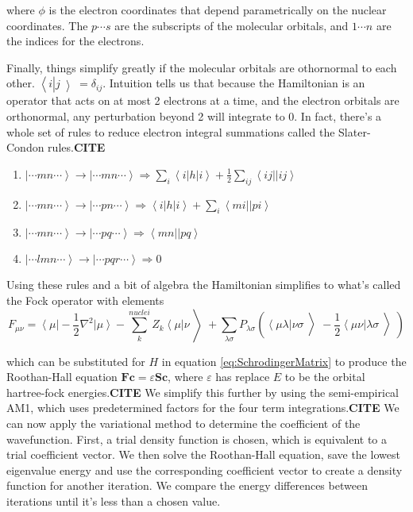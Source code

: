     where $\phi$ is the electron coordinates that depend parametrically on the
    nuclear coordinates.  The $p \cdots s$ are the subscripts of the
    molecular orbitals, and $1 \cdots n$ are the indices for the
    electrons.

    Finally, things simplify greatly if the molecular orbitals are
    othornormal to each other. $\left<\right.i\left|\right.j\left>\right. = \delta_{ij}$.
    Intuition tells us that because the Hamiltonian is an operator that
    acts on at most 2 electrons at a time, and the electron orbitals
    are orthonormal, any perturbation beyond 2 will integrate to 0.  In
    fact, there's a whole set of rules to reduce electron integral
    summations called the Slater-Condon rules.\textbf{CITE}

    \begin{enumerate}
    \item
      $ \left | \cdots mn \cdots \right > \rightarrow \left | \cdots mn
	\cdots \right > \Rightarrow \sum_i \left< i \right| h \left| i
      \right> + \frac{1}{2} \sum_{ij} \left< ij \right|\left| ij \right> $
    \item
      $ \left | \cdots mn \cdots \right > \rightarrow \left | \cdots pn
	\cdots \right > \Rightarrow \left< i \right| h \left| i \right> +
      \sum_{i} \left<mi \right|\left| pi \right> $
    \item
      $ \left | \cdots mn \cdots \right > \rightarrow \left | \cdots pq
	\cdots \right > \Rightarrow \left < mn \right | \left | pq \right
      > $
    \item
      $ \left | \cdots lmn \cdots \right > \rightarrow \left | \cdots pqr
	\cdots \right > \Rightarrow 0 $
    \end{enumerate}

    Using these rules and a bit of algebra the Hamiltonian simplifies to
    what's called the Fock operator with elements
    \begin{equation}
      F_{\mu\nu} = \left< \mu \right| -\frac{1}{2}\nabla^2 \left| \mu \right>
      - \sum_{k}^{nuclei}Z_{k} \left< \mu \right| \nu \left> \right.
      + \sum_{\lambda \sigma} P_{\lambda \sigma}
      \left(
	\left< \mu \lambda \right| \nu \sigma \left>\right.
	- \frac{1}{2} \left< \mu \nu \right| \lambda \sigma \left>\right.
      \right)
    \end{equation}

    which can be substituted for $H$ in equation \ref{eq:SchrodingerMatrix} to produce the Roothan-Hall equation $\mathbf{Fc}=\varepsilon\mathbf{Sc}$, where $\varepsilon$ has replace $E$ to be the orbital hartree-fock energies.\textbf{CITE}
    We simplify this further by using the semi-empirical AM1, which uses predetermined factors for the four term integrations.\textbf{CITE}
    We can now apply the variational method to determine the coefficient of the wavefunction.
    First, a trial density function is chosen, which is equivalent to a trial coefficient vector.
    We then solve the Roothan-Hall equation, save the lowest eigenvalue energy and use the corresponding coefficient vector to create a density function for another iteration.
    We compare the energy differences between iterations until it's less than a chosen value.

